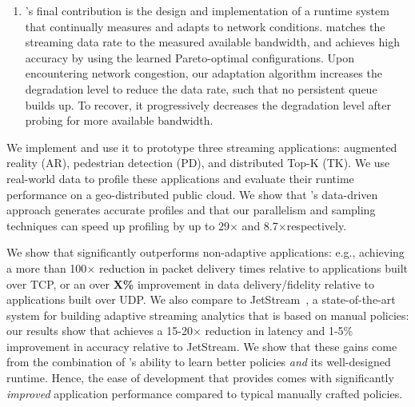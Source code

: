 \begin{enumerate}
\item \sysname{}'s  final contribution is the design and implementation of a runtime system that continually measures and adapts to network conditions.
\sysname{} matches the streaming data rate to the measured available bandwidth, and achieves high accuracy by using the learned Pareto-optimal configurations. 
Upon encountering network congestion, our adaptation algorithm
increases the degradation level to reduce the data rate, such that no persistent
queue builds up. To recover, it progressively decreases the degradation level
after probing for more available bandwidth. 
\end{enumerate} 




We implement \sysname{} and use it to prototype three streaming applications: augmented
reality (AR), pedestrian detection (PD), and distributed Top-K (TK). We use
real-world data to profile these applications and evaluate their runtime
performance on a geo-distributed public cloud.  We show that \sysname{}'s data-driven 
approach generates accurate profiles and that our parallelism and sampling techniques 
can speed up profiling by up to 29$\times$ and 8.7$\times$\@ respectively.

We show that \sysname{} significantly outperforms non-adaptive applications: e.g., 
achieving a more than 100$\times$ reduction in packet delivery times relative to applications 
built over TCP, or an over {\bf X\%} improvement in data delivery/fidelity relative 
to applications built over UDP. 
We also compare \sysname{} to JetStream~\cite{}, a state-of-the-art system 
for building adaptive streaming analytics that is based on manual policies: our 
results show that \sysname achieves a  15-20$\times$ reduction in latency and 1-5\% improvement 
in accuracy relative to JetStream. We show that these gains come from the combination 
of \sysname{}'s ability to learn better policies \emph{and} its well-designed runtime.
Hence, the ease of development that \sysname provides comes with significantly \emph{improved} application performance compared to typical manually crafted policies. 